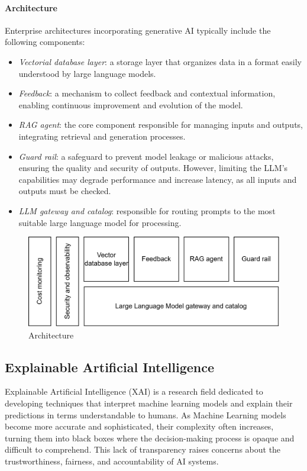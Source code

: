 \paragraph*{Architecture}
Enterprise architectures incorporating generative AI typically include the following components:
\begin{itemize}
    \item \textit{Vectorial database layer}: a storage layer that organizes data in a format easily understood by large language models.
    \item \textit{Feedback}: a mechanism to collect feedback and contextual information, enabling continuous improvement and evolution of the model.
    \item \textit{RAG agent}: the core component responsible for managing inputs and outputs, integrating retrieval and generation processes.
    \item \textit{Guard rail}: a safeguard to prevent model leakage or malicious attacks, ensuring the quality and security of outputs.
        However, limiting the LLM's capabilities may degrade performance and increase latency, as all inputs and outputs must be checked.
    \item \textit{LLM gateway and catalog}: responsible for routing prompts to the most suitable large language model for processing.
\end{itemize}

\begin{figure}[H]
    \centering
    \includegraphics[width=0.75\linewidth]{images/bis14.png}
    \caption{Architecture}
\end{figure}

\subsection{Explainable Artificial Intelligence}
Explainable Artificial Intelligence (XAI) is a research field dedicated to developing techniques that interpret machine learning models and explain their predictions in terms understandable to humans. 
As Machine Learning models become more accurate and sophisticated, their complexity often increases, turning them into black boxes where the decision-making process is opaque and difficult to comprehend. 
This lack of transparency raises concerns about the trustworthiness, fairness, and accountability of AI systems.

